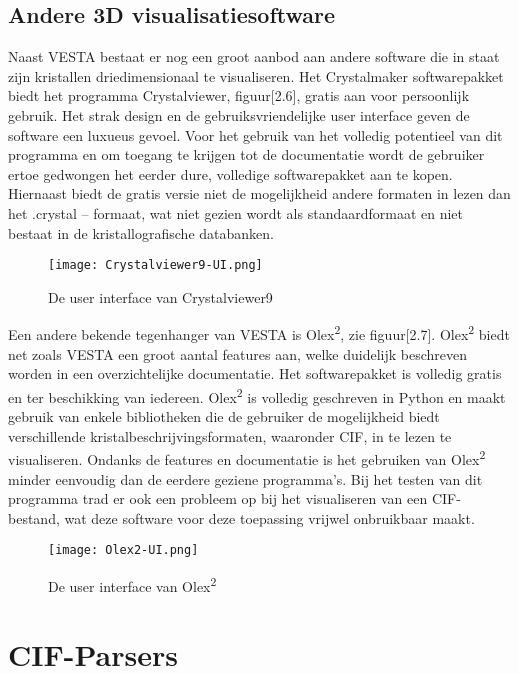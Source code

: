 \subsection{Andere 3D visualisatiesoftware}
Naast VESTA bestaat er nog een groot aanbod aan andere software die in staat zijn kristallen driedimensionaal te visualiseren. Het Crystalmaker softwarepakket biedt het programma Crystalviewer, figuur[2.6], gratis aan voor persoonlijk gebruik. Het strak design en de gebruiksvriendelijke user interface geven de software een luxueus gevoel. Voor het gebruik van het volledig potentieel van dit programma en om toegang te krijgen tot de documentatie wordt de gebruiker ertoe gedwongen het eerder dure, volledige softwarepakket aan te kopen. Hiernaast biedt de gratis versie niet de mogelijkheid andere formaten in lezen dan het .crystal – formaat, wat niet gezien wordt als standaardformaat en niet bestaat in de kristallografische databanken. 

\begin{figure}[h]
\texttt{[image: Crystalviewer9-UI.png]}
\caption{De user interface van Crystalviewer9}
\end{figure}

\par
Een andere bekende tegenhanger van VESTA is Olex\textsuperscript{2}, zie figuur[2.7]. Olex\textsuperscript{2} biedt net zoals VESTA een groot aantal features aan, welke duidelijk beschreven worden in een overzichtelijke documentatie. Het softwarepakket is volledig gratis en ter beschikking van iedereen. Olex\textsuperscript{2} is volledig geschreven in Python en maakt gebruik van enkele bibliotheken die de gebruiker de mogelijkheid biedt verschillende kristalbeschrijvingsformaten, waaronder CIF, in te lezen te visualiseren. Ondanks de features en documentatie is het gebruiken van Olex\textsuperscript{2} minder eenvoudig dan de eerdere geziene programma’s. Bij het testen van dit programma trad er ook een probleem op bij het visualiseren van een CIF-bestand, wat deze software voor deze toepassing vrijwel onbruikbaar maakt.

\begin{figure}[h]
\texttt{[image: Olex2-UI.png]}
\caption{De user interface van Olex\textsuperscript{2}}
\end{figure}

\section{CIF-Parsers}
